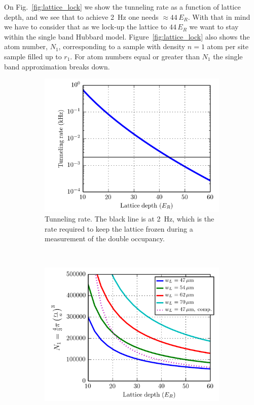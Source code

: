 \documentclass[11pt,letter]{article}
\begin{document}
On Fig.~\ref{fig:lattice_lock} we show the tunneling rate as a function of
lattice depth, and we see that to achieve 2~Hz one needs $\approx 44\,E_{R}$.
With that in mind we have to consider that as we lock-up the lattice to
$44\,E_{R}$ we want to stay within the single band Hubbard model.
Figure~\ref{fig:lattice_lock} also shows the atom number, $N_{1}$,
corresponding to a sample with density $n=1$ atom per site sample filled up to
$r_{1}$. For atom numbers equal or greater than $N_{1}$ the single band
approximation breaks down.   
\begin{figure}
        \centering
        \begin{subfigure}[t]{0.48\textwidth}
		\includegraphics[width=\textwidth]{figures/lattice_tunneling.png}
\caption{Tunneling rate.  The black line is at 2~Hz, which is the rate required
to keep the lattice frozen during a measurement of the double occupancy.}
                \label{fig:lattice_lockA}
        \end{subfigure}
        ~ %
        \begin{subfigure}[t]{0.48\textwidth}
		\includegraphics[width=\textwidth]{figures/lattice_lock.png}

\end{subfigure}
\end{figure}
\end{document}
